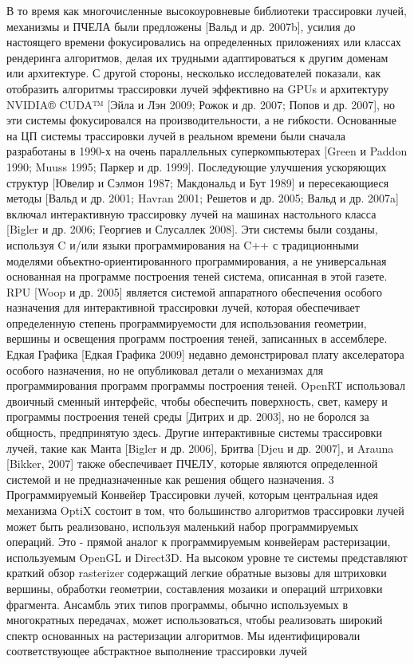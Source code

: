 В то время как многочисленные высокоуровневые библиотеки трассировки лучей, механизмы и ПЧЕЛА были предложены [Вальд и др. 2007b], усилия до настоящего времени фокусировались на определенных приложениях или классах рендеринга алгоритмов, делая их трудными адаптироваться к другим доменам или архитектуре. С другой стороны, несколько исследователей показали, как отобразить алгоритмы трассировки лучей эффективно на GPUs и архитектуру NVIDIA® CUDA™ [Эйла и Лэн 2009; Рожок и др. 2007; Попов и др. 2007], но эти системы фокусировался на производительности, а не гибкости. Основанные на ЦП системы трассировки лучей в реальном времени были сначала разработаны в 1990-х на очень параллельных суперкомпьютерах [Green и Paddon 1990; Muuss 1995; Паркер и др. 1999]. Последующие улучшения ускоряющих структур [Ювелир и Сэлмон 1987; Макдональд и Бут 1989] и пересекающиеся методы [Вальд и др. 2001; Havran 2001; Решетов и др. 2005; Вальд и др. 2007a] включал интерактивную трассировку лучей на машинах настольного класса [Bigler и др. 2006; Георгиев и Слусаллек 2008]. Эти системы были созданы, используя C и/или языки программирования на C++ с традиционными моделями объектно-ориентированного программирования, а не универсальная основанная на программе построения теней система, описанная в этой газете. RPU [Woop и др. 2005] является системой аппаратного обеспечения особого назначения для интерактивной трассировки лучей, которая обеспечивает определенную степень программируемости для использования геометрии, вершины и освещения программ построения теней, записанных в ассемблере. Едкая Графика [Едкая Графика 2009] недавно демонстрировал плату акселератора особого назначения, но не опубликовал детали о механизмах для программирования программ программы построения теней.
OpenRT использовал двоичный сменный интерфейс, чтобы обеспечить поверхность, свет, камеру и программы построения теней среды [Дитрих и др. 2003], но не боролся за общность, предпринятую здесь. Другие интерактивные системы трассировки лучей, такие как Манта [Bigler и др. 2006], Бритва [Djeu и др. 2007], и Arauna [Bikker, 2007] также обеспечивает ПЧЕЛУ, которые являются определенной системой и не предназначенные как решения общего назначения.
3 Программируемый Конвейер Трассировки лучей, которым центральная идея механизма OptiX состоит в том, что большинство алгоритмов трассировки лучей может быть реализовано, используя маленький набор программируемых операций. Это - прямой аналог к программируемым конвейерам растеризации, используемым OpenGL и Direct3D. На высоком уровне те системы представляют краткий обзор rasterizer содержащий легкие обратные вызовы для штриховки вершины, обработки геометрии, составления мозаики и операций штриховки фрагмента. Ансамбль этих типов программы, обычно используемых в многократных передачах, может использоваться, чтобы реализовать широкий спектр основанных на растеризации алгоритмов. Мы идентифицировали соответствующее абстрактное выполнение трассировки лучей
